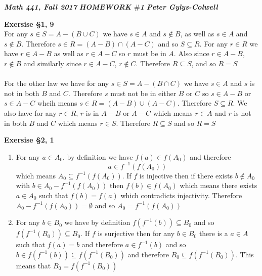 \documentclass[12pt]{article}
\newenvironment{ques}[1]{\textbf{Exersise #1}\vspace{1 mm}\\ }{\bigskip}
\theoremstyle{definition}
\begin{document}
\noindent \textit{\textbf{Math 441, Fall 2017}} \hspace{1.3cm}
\textit{\textbf{HOMEWORK $\#$1}} \hspace{1.3cm} \textit{\textbf{Peter
Gylys-Colwell}} 

\vspace{1cm}

\begin{ques}{\S 1, 9}
	For any $s \in S = A - (B \cup C)$ we have $s \in A$ and $s \notin B$,
	as well as $s \in A$ and $s\notin B$. Therefore $s \in R = (A - B) \cap
	(A - C)$ and so $S \subseteq R$. For any $r \in R$ we have $r \in A -
	B$ as well as $r \in A-C$ so $r$ must be in $A$. Also since $r \in
	A-B$, $r \notin B$ and similarly since $r \in A-C$, $r\notin C$.
	Therefore $R \subseteq S$, and so $R = S$\\ 
	\\
	For the other law we have
	for any $s \in S = A- (B\cap C)$ we have $s \in A$ and $s$ is not in
	both $B$ and $C$. Therefore $s$ must not be in either $B$ or $C$ so $s
	\in A-B$ or $s \in A-C$ whcih means $s \in R = (A-B)\cup (A-C)$.
	Therefore $S \subseteq R$. We also have for any $r \in R$, $r$ is in $A
	- B$ or $A -C$ which means $r \in A$ and $r$ is not in both $B$ and $C$
	which means $r \in S$. Therefore $R \subseteq S$ and so $R = S$

\end{ques}

\begin{ques}{\S 2, 1}
	\begin{enumerate}
		\item
			For any $a \in A_0$, by definition we have $f(a) \in
			f(A_0)$ and therefore 
			$$a \in f^{-1}(f(A_0))$$
			which means $A_0 \subseteq f^{-1}(f(A_0))$. If $f$ is
			injective then if there exists $b \notin A_0$ with $b
			\in A_0 - f^{-1}(f(A_0))$ then $f(b) \in f(A_0)$ which
			means there exists $a \in A_0$ such that $f(b) = f(a)$
			which contradicts injectivity. Therefore $A_0 -
			f^{-1}(f(A_0)) = \emptyset$ and so $A_0 =
			f^{-1}(f(A_0))$

		\item
			For any $b \in B_0$ we have by definition $f(f^{-1}(b))
			\subseteq B_0$ and so $f(f^{-1}(B_0)) \subseteq B_0$.
			If $f$ is surjective then for any $b \in B_0$ there is
			a $a \in A$ such that $f(a) = b$ and therefore $a \in
			f^{-1}(b)$ and so $b \in f(f^{-1}(b)) \subseteq
			f(f^{-1}(B_0))$ and therefore $B_0 \subseteq
			f(f^{-1}(B_0))$. This means that $B_0 = f(f^{-1}(B_0))$

	\end{enumerate}
\end{ques}
\end{document}
